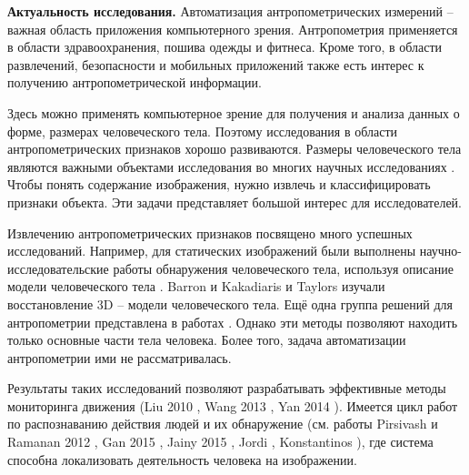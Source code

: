 
\textbf{Актуальность исследования.}
Автоматизация антропометрических измерений  -- важная область приложения компьютерного зрения.  Антропометрия применяется в области здравоохранения, пошива одежды и фитнеса.  Кроме того, в области развлечений, безопасности и мобильных приложений также есть интерес к получению антропометрической информации.

Здесь можно применять компьютерное зрение для получения и анализа данных о форме, размерах человеческого тела. Поэтому исследования в области антропометрических признаков хорошо развиваются. Размеры человеческого тела являются важными объектами исследования во многих научных исследованиях \cite{Paul2011,Michaell2011,Wuhre2014}. Чтобы понять содержание изображения, нужно извлечь и классифицировать признаки объекта. Эти задачи представляет большой интерес для исследователей.

Извлечению антропометрических признаков посвящено много успешных исследований. Например, для статических изображений были выполнены научно-исследовательские работы обнаружения человеческого тела, используя описание модели человеческого тела \cite{YuChen2011, Albio2001}. Barron и Kakadiaris \cite{Barron2000} и Taylors \cite{Taylor2000} изучали восстановление 3D – модели человеческого тела. Ещё одна группа решений для антропометрии представлена в работах \cite{Micilotta2005, Mikolajczyk2004, Robert2004, Ronfard2002}. Однако эти методы позволяют находить только основные части тела человека. Более того, задача автоматизации антропометрии ими не рассматривалась.

Результаты таких исследований позволяют разрабатывать эффективные методы мониторинга движения (Liu 2010 \cite{Liu2010}, Wang  2013 \cite{Wang2013},  Yan 2014 \cite{Yan2014}). Имеется цикл работ по распознаванию действия людей и их обнаружение (см. работы Pirsivash и Ramanan  2012 \cite{Pirsiavash2012}, Gan 2015 \cite{Gan2015}, Jainy 2015 \cite{Jainy2015}, Jordi \cite{Jordi2012}, Konstantinos \cite{Konstantinos2016}), где система способна локализовать деятельность человека на изображении.

